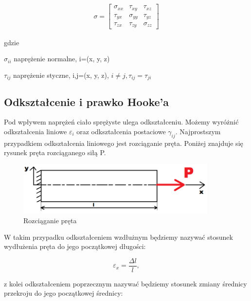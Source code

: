 \begin{gather}
	\sigma=\begin{bmatrix} 
	  \sigma_{xx}    & \tau_{xy} & \tau_{xz} \\ 
	  \tau_{yx} & \sigma_{yy} & \tau_{yz} \\
	  \tau_{zx} & \tau_{zy} & \sigma_{zz} 
	\end{bmatrix}
\end{gather}

gdzie

\begin{eqwhere}[2cm]
        \item[$\sigma_{ii}$] naprężenie normalne, i=(x, y, z)
        \item[$\tau_{ij}$] naprężenie styczne, i,j=(x, y, z), \( i \neq j, \tau_{ij}=\tau_{ji}\)
\end{eqwhere}

\subsection{Odkształcenie i prawko Hooke'a}
\label{sec:odksztalcenie_i_prawo_hookea}

	Pod wpływem naprężeń ciało sprężyste ulega odkształceniu. Możemy wyróżnić odkształcenia liniowe \( \varepsilon_i \) oraz odkształcenia postaciowe \( \gamma_{ij} \). Najprostszym przypadkiem odkształcenia liniowego jest rozciąganie pręta. Poniżej znajduje się rysunek pręta rozciąganego siłą P. 

\begin{figure}[h]
\centering
\includegraphics[width=10cm]{Zdjecia/2/rozciaganie}
\caption{Rozciąganie pręta}
\label{fig:rozciaganie}
\end{figure}

	W takim przypadku odkształceniem wzdłużnym będziemy nazywać stosunek wydłużenia pręta do jego początkowej długości:

\begin{equation}
\varepsilon_x=\frac{\Delta l}{l},
\end{equation}
	
	z kolei odkształceniem poprzecznym nazywać będziemy stosunek zmiany średnicy przekroju do jego początkowej średnicy:

